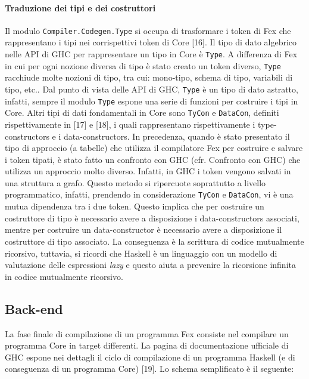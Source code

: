 \documentclass[10pt,a4paper]{article}
\begin{document}
\paragraph{Traduzione dei tipi e dei costruttori}
Il modulo \texttt{Compiler.Codegen.Type} si occupa di trasformare i token di Fex che rappresentano i tipi nei
corrispettivi token di Core [16]. Il tipo di dato algebrico nelle API di GHC per rappresentare un tipo in Core è
\texttt{Type}. A differenza di Fex in cui per ogni nozione diversa di tipo è stato creato un token diverso,
\texttt{Type} racchiude molte nozioni di tipo, tra cui: mono-tipo, schema di tipo, variabili di tipo, etc.. Dal
punto di vista delle API di GHC, \texttt{Type} è un tipo di dato astratto, infatti, sempre il modulo \texttt{Type}
espone una serie di funzioni per costruire i tipi in Core. Altri tipi di dati fondamentali in Core sono \texttt{TyCon} e
\texttt{DataCon}, definiti rispettivamente in [17] e [18], i quali rappresentano rispettivamente i type-constructors e
i data-constructors. In precedenza, quando è stato presentato il tipo di approccio (a tabelle) che utilizza il
compilatore Fex
per costruire e salvare i token tipati, è stato fatto un confronto con GHC (cfr. Confronto con GHC) che utilizza un
approccio molto diverso. Infatti, in GHC i token vengono salvati in una struttura a grafo. Questo metodo si
ripercuote soprattutto a livello programmatico, infatti, prendendo in considerazione \texttt{TyCon} e \texttt{DataCon},
vi è una mutua dipendenza tra i due token. Questo implica che per costruire un costruttore di tipo è
necessario avere a disposizione i data-constructors associati, mentre per costruire un data-constructor è necessario avere a
disposizione il costruttore di tipo associato. La conseguenza è la scrittura di codice mutualmente ricorsivo, tuttavia,
si ricordi che Haskell è un linguaggio con un modello di valutazione delle espressioni \textit{lazy} e questo aiuta a
prevenire la ricorsione infinita in codice mutualmente ricorsivo.

\subsection{Back-end}
La fase finale di compilazione di un programma Fex consiste nel compilare un programma Core in target differenti.
La pagina di documentazione ufficiale di GHC espone nei dettagli il ciclo di compilazione di un programma Haskell (e
di conseguenza di un programma Core) [19]. Lo schema semplificato è il seguente:
\newline
\end{document}
